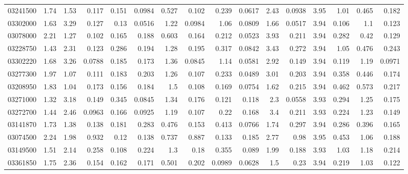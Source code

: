 \begin{longtable}{l r rr rr rr rr rr rr rr}
03241500 & 1.74 & 1.53 & {0.117} & 0.151 & {0.0984} & 0.527 & {0.102} & 0.239 & {0.0617} & 2.43 & {0.0938} & 3.95 & {1.01} & 0.465 & {0.182}\\
03302000 & 1.63 & 3.29 & {0.127} & 0.13 & {0.0516} & 1.22 & {0.0984} & 1.06 & {0.0809} & 1.66 & {0.0517} & 3.94 & {0.106} & 1.1 & {0.123}\\
03078000 & 2.21 & 1.27 & {0.102} & 0.165 & 0.188 & 0.603 & {0.164} & 0.212 & {0.0523} & 3.93 & {0.211} & 3.94 & {0.282} & 0.42 & {0.129}\\
03228750 & 1.43 & 2.31 & {0.123} & 0.286 & {0.194} & 1.28 & {0.195} & 0.317 & {0.0842} & 3.43 & {0.272} & 3.94 & {1.05} & 0.476 & {0.243}\\
03302220 & 1.68 & 3.26 & {0.0788} & 0.185 & {0.173} & 1.36 & {0.0845} & 1.14 & {0.0581} & 2.92 & {0.149} & 3.94 & {0.119} & 1.19 & {0.0971}\\
03277300 & 1.97 & 1.07 & {0.111} & 0.183 & 0.203 & 1.26 & {0.107} & 0.233 & {0.0489} & 3.01 & {0.203} & 3.94 & {0.358} & 0.446 & {0.174}\\
03208950 & 1.83 & 1.04 & {0.173} & 0.156 & 0.184 & 1.5 & {0.108} & 0.169 & {0.0754} & 1.62 & {0.215} & 3.94 & {0.462} & 0.573 & {0.217}\\
03271000 & 1.32 & 3.18 & {0.149} & 0.345 & {0.0845} & 1.34 & {0.176} & 0.121 & {0.118} & 2.3 & {0.0558} & 3.93 & {0.294} & 1.25 & {0.175}\\
03272700 & 1.44 & 2.46 & {0.0963} & 0.166 & {0.0925} & 1.19 & {0.107} & 0.22 & {0.168} & 3.4 & {0.211} & 3.93 & {0.224} & 1.23 & {0.149}\\
03141870 & 1.73 & 1.38 & {0.138} & 0.181 & 0.283 & 0.476 & {0.153} & 0.413 & {0.0766} & 1.74 & {0.297} & 3.94 & {0.286} & 0.396 & {0.165}\\
03074500 & 2.24 & 1.98 & {0.932} & 0.12 & 0.138 & 0.737 & 0.887 & 0.133 & 0.185 & 2.77 & {0.98} & 3.95 & {0.453} & 1.06 & {0.188}\\
03149500 & 1.51 & 2.14 & {0.258} & 0.108 & 0.224 & 1.3 & {0.18} & 0.355 & {0.089} & 1.99 & {0.188} & 3.93 & {1.03} & 1.18 & {0.214}\\
03361850 & 1.75 & 2.36 & {0.154} & 0.162 & 0.171 & 0.501 & {0.202} & 0.0989 & {0.0628} & 1.5 & {0.23} & 3.94 & {0.219} & 1.03 & {0.122}\\
\end{longtable}
